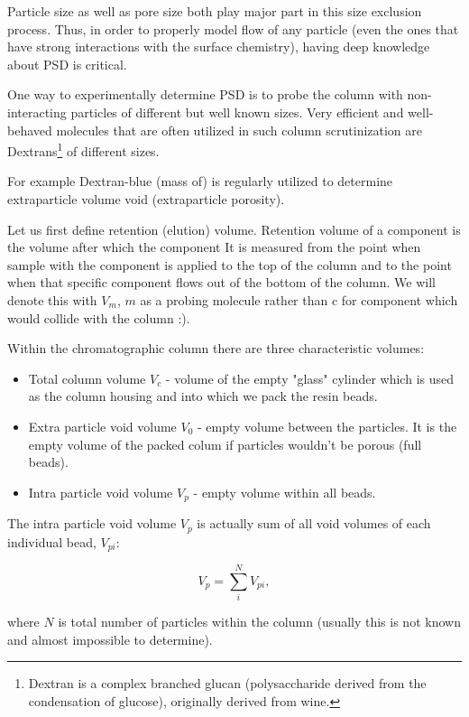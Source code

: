Particle size as well as pore size both play major part in this size exclusion
process. Thus, in order to properly model flow of any particle (even the ones
that have strong interactions with the surface chemistry), having deep
knowledge about PSD is critical.

One way to experimentally determine PSD is to probe the column with
non-interacting particles of different but well known sizes. Very efficient and
well-behaved molecules that are often utilized in such column scrutinization
are Dextrans\footnote{Dextran is a complex branched glucan (polysaccharide
derived from the condensation of glucose), originally derived from wine.} 
of different sizes.


For example Dextran-blue (mass of) is regularly utilized to determine
extraparticle volume void (extraparticle porosity).

Let us first define retention (elution) volume. Retention volume of a component 
is the volume after which the component It is measured from the point when
sample with the component is applied to the top of the column and to the point when that
specific component flows out of the bottom of the column. We will denote this
with $V_m$, $m$ as a probing molecule rather than c for component which would collide
with the column :).

Within the chromatographic column there are three characteristic volumes:

\begin{itemize}
    \item Total column volume $V_c$ - volume of the empty "glass" cylinder which is
        used as the column housing and into which we pack the resin beads. 
    \item Extra particle void volume $V_0$ - empty volume between the
        particles. It is the empty volume of the packed colum if particles
        wouldn't be porous (full beads).
    \item Intra particle void volume $V_{p}$ - empty volume within all beads.
\end{itemize}

The intra particle void volume $V_{p}$ is actually sum of all void volumes of
each individual bead, $V_{pi}$:

\[V_p = \sum_{i}^{N}V_{pi},\]

where $N$ is total number of particles within the column (usually this is not
known and almost impossible to determine).


